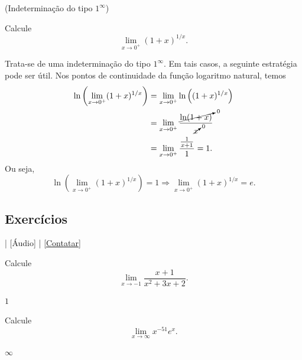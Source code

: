 \begin{exeresol}(Indeterminação do tipo $1^\infty$)

  Calcule
  \begin{equation}
    \lim_{x\to 0^+} (1+x)^{1/x}.
  \end{equation}
\end{exeresol}
\begin{resol}
  Trata-se de uma indeterminação do tipo $1^\infty$. Em tais casos, a seguinte estratégia pode ser útil. Nos pontos de continuidade da função logaritmo natural, temos
  \begin{align}
    \ln\left(\lim_{x\to 0^+} (1+x)^{1/x}\right) &= \lim_{x\to 0^+} \ln\left((1+x)^{1/x}\right) \\
                                                &= \lim_{x\to 0^+} \frac{\cancelto{0}{\ln(1+x)}}{\cancelto{0}{x}} \\
                                                &= \lim_{x\to 0^+} \frac{\frac{1}{x+1}}{1} = 1.
  \end{align}
  Ou seja,
  \begin{equation}
    \ln\left(\lim_{x\to 0^+} (1+x)^{1/x}\right) = 1 \Rightarrow \lim_{x\to 0^+} (1+x)^{1/x} = e.
  \end{equation}
\end{resol}

\subsection*{Exercícios}

\begin{flushright}
  [Vídeo] | [Áudio] | \href{https://phkonzen.github.io/notas/contato.html}{[Contatar]}
\end{flushright}

\begin{exer}
  Calcule
  \begin{equation}
    \lim_{x\to -1} \frac{x+1}{x^2+3x+2}.
  \end{equation}
\end{exer}
\begin{resp}
  $1$
\end{resp}

\begin{exer}
  Calcule
  \begin{equation}
    \lim_{x\to \infty} x^{-51}e^x.
  \end{equation}
\end{exer}
\begin{resp}
  $\infty$
\end{resp}

